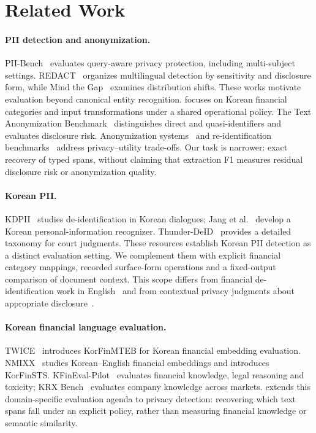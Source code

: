 \section{Related Work}
\label{sec:related}

\paragraph{PII detection and anonymization.}
PII-Bench~\cite{shen2025piibench} evaluates query-aware privacy protection, including multi-subject settings. REDACT~\cite{vats2026redact} organizes multilingual detection by sensitivity and disclosure form, while Mind the Gap~\cite{zafar2026mindthegap} examines distribution shifts. These works motivate evaluation beyond canonical entity recognition. \kiii{} focuses on Korean financial categories and input transformations under a shared operational policy. The Text Anonymization Benchmark~\cite{pilan2022tab} distinguishes direct and quasi-identifiers and evaluates disclosure risk. Anonymization systems~\cite{staab2025anonymizers,yang2025rupta} and re-identification benchmarks~\cite{krco2026ratbench} address privacy--utility trade-offs. Our task is narrower: exact recovery of typed spans, without claiming that extraction F1 measures residual disclosure risk or anonymization quality.

\paragraph{Korean PII.}
KDPII~\cite{fei2024kdpii} studies de-identification in Korean dialogues; Jang et al.~\cite{jang2024koreanpiiner} develop a Korean personal-information recognizer. Thunder-DeID~\cite{hahm2025thunderdeid} provides a detailed taxonomy for court judgments. These resources establish Korean PII detection as a distinct evaluation setting. We complement them with explicit financial category mappings, recorded surface-form operations and a fixed-output comparison of document context. This scope differs from financial de-identification work in English~\cite{albanese2026anonymous} and from contextual privacy judgments about appropriate disclosure~\cite{mireshghallah2024confaide,shao2024privacylens}.

\paragraph{Korean financial language evaluation.}
TWICE~\cite{hwang2025twice} introduces KorFinMTEB for Korean financial embedding evaluation. NMIXX~\cite{lee2025nmixx} studies Korean--English financial embeddings and introduces KorFinSTS. KFinEval-Pilot~\cite{hwang2025kfineval} evaluates financial knowledge, legal reasoning and toxicity; KRX Bench~\cite{son2024krx} evaluates company knowledge across markets. \kiii{} extends this domain-specific evaluation agenda to privacy detection: recovering which text spans fall under an explicit policy, rather than measuring financial knowledge or semantic similarity.
